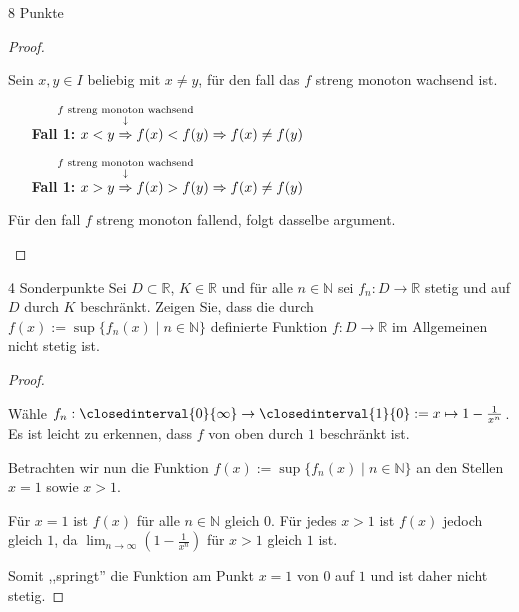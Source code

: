 \documentclass{../problemset}
\begin{document}
\begin{problem}{8 Punkte}
\begin{proof}
\begin{itemize}
		      Sein $x,y \in I$ beliebig mit $x \ne y$, für den fall das $f$ streng monoton wachsend ist.

		      \begin{itemize}
			      \item [\textbf{Fall 1:}] $x < y \annotated{$f$ streng monoton wachsend}{\Rightarrow} f(x) < f(y) \Rightarrow f(x) \ne f(y)$ \checkmark
			      \item [\textbf{Fall 1:}] $x > y \annotated{$f$ streng monoton wachsend}{\Rightarrow} f(x) > f(y) \Rightarrow f(x) \ne f(y)$ \checkmark
		      \end{itemize}

		      Für den fall $f$ streng monoton fallend, folgt dasselbe argument.
	\end{itemize}
\end{proof}
\end{problem}

\begin{problem}{4 Sonderpunkte}
Sei $D \subset \mathbb{R}$, $K \in \mathbb{R}$ und für alle $n \in \mathbb{N}$ sei $f_n : D \to \mathbb{R}$ stetig und auf $D$ durch $K$ beschränkt. Zeigen Sie, dass die durch $f(x) := \sup\{f_n(x) \mid n \in \mathbb{N}\}$ definierte Funktion $f : D \to \mathbb{R}$ im Allgemeinen nicht stetig ist.
\begin{proof}
	$ $

	Wähle $f_n: \closedinterval{0}{\infty} \rightarrow \closedinterval{1}{0} := x \mapsto 1 - \frac{1}{x^n}$. Es ist leicht zu erkennen, dass $f$ von oben durch $1$ beschränkt ist.

	Betrachten wir nun die Funktion $f(x) := \sup\{f_n(x) \mid n \in \mathbb{N}\}$ an den Stellen $x = 1$ sowie $x > 1$.

	Für $x = 1$ ist $f(x)$ für alle $n \in \mathbb{N}$ gleich $0$. Für jedes $x > 1$ ist $f(x)$ jedoch gleich $1$, da $\lim_{{n \to \infty}} (1 - \frac{1}{x^n})$ für $x > 1$ gleich $1$ ist.

	Somit ,,springt'' die Funktion am Punkt $x = 1$ von $0$ auf $1$ und ist daher nicht stetig.
\end{proof}
\end{problem}
\end{document}
